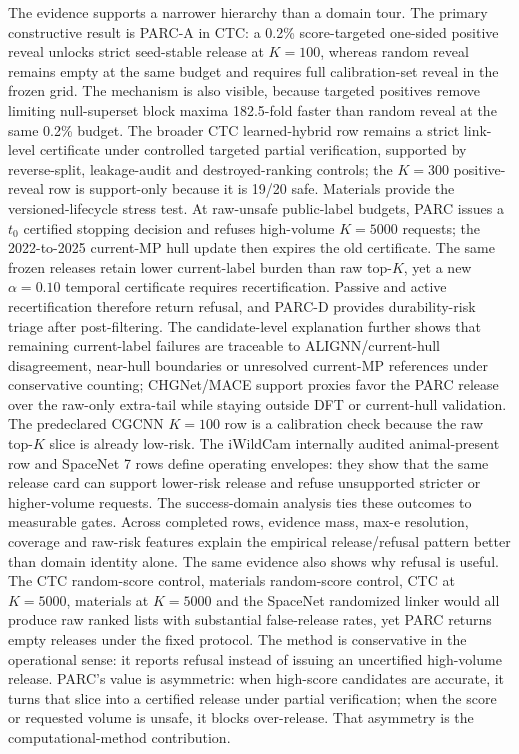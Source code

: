 \documentclass[10pt,twocolumn]{article}
\begin{document}
The evidence supports a narrower hierarchy than a domain tour.
The primary constructive result is PARC-A in CTC: a 0.2\% score-targeted one-sided positive reveal unlocks strict seed-stable release at \(K=100\), whereas random reveal remains empty at the same budget and requires full calibration-set reveal in the frozen grid.
The mechanism is also visible, because targeted positives remove limiting null-superset block maxima 182.5-fold faster than random reveal at the same 0.2\% budget.
The broader CTC learned-hybrid row remains a strict link-level certificate under controlled targeted partial verification, supported by reverse-split, leakage-audit and destroyed-ranking controls; the \(K=300\) positive-reveal row is support-only because it is 19/20 safe.
Materials provide the versioned-lifecycle stress test.
At raw-unsafe public-label budgets, PARC issues a \(t_0\) certified stopping decision and refuses high-volume \(K=5000\) requests; the 2022-to-2025 current-MP hull update then expires the old certificate.
The same frozen releases retain lower current-label burden than raw top-\(K\), yet a new \(\alpha=0.10\) temporal certificate requires recertification.
Passive and active recertification therefore return refusal, and PARC-D provides durability-risk triage after post-filtering.
The candidate-level explanation further shows that remaining current-label failures are traceable to ALIGNN/current-hull disagreement, near-hull boundaries or unresolved current-MP references under conservative counting; CHGNet/MACE support proxies favor the PARC release over the raw-only extra-tail while staying outside DFT or current-hull validation.
The predeclared CGCNN \(K=100\) row is a calibration check because the raw top-\(K\) slice is already low-risk.
The iWildCam internally audited animal-present row and SpaceNet 7 rows define operating envelopes: they show that the same release card can support lower-risk release and refuse unsupported stricter or higher-volume requests.
The success-domain analysis ties these outcomes to measurable gates.
Across completed rows, evidence mass, max-e resolution, coverage and raw-risk features explain the empirical release/refusal pattern better than domain identity alone.
The same evidence also shows why refusal is useful.
The CTC random-score control, materials random-score control, CTC at \(K=5000\), materials at \(K=5000\) and the SpaceNet randomized linker would all produce raw ranked lists with substantial false-release rates, yet PARC returns empty releases under the fixed protocol.
The method is conservative in the operational sense: it reports refusal instead of issuing an uncertified high-volume release.
PARC's value is asymmetric: when high-score candidates are accurate, it turns that slice into a certified release under partial verification; when the score or requested volume is unsafe, it blocks over-release.
That asymmetry is the computational-method contribution.
\end{document}
